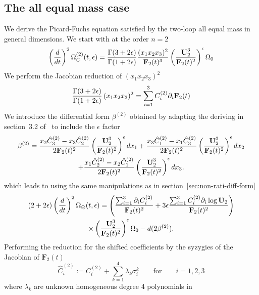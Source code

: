 \documentclass[a4paper,12pt]{article}
\numberwithin{equation}{section}
\numberwithin{figure}{section}
\def\su{\circleddash}
\begin{document}
\subsection{The all equal mass case}\label{sec:2sunset1mass}
We derive the Picard-Fuchs equation satisfied by the two-loop all
equal mass in general dimensions. 
We  start with at the order $n=2$ 
\begin{equation}
 \left(d\over dt\right)^2
 \Omega_\su^{(2)}(t,\epsilon)={\Gamma(3+2\epsilon)\over\Gamma(1+2\epsilon)} {(x_1x_2x_3)^2\over \textbf{F}_2(t)^3}
 \left(\textbf{U}_2^3\over \textbf{F}_2(t)^2\right)^\epsilon  \Omega_0
\end{equation}
%
We perform the Jacobian reduction of $(x_1x_2x_3)^2$
\begin{equation}\label{e:reduc}
  {\Gamma(3+2\epsilon)\over\Gamma(1+2\epsilon)}\,  (x_1x_2x_3)^2= \sum_{i=1}^3 C_i^{(2)}\partial_i \textbf{F}_2(t)
\end{equation}
%
We introduce the differential form $\beta^{(2)}$ obtained by adapting the deriving in section~3.2
 of~\cite{Bloch:2016izu} to include the $\epsilon$ factor
 \begin{multline}
   \beta^{(2)}=   {x_2 \hat C_3^{(2)}-x_3 \hat C_2^{(2)}\over
   2  \textbf{F}_2(t)^2} \left(\textbf{U}_2^3\over \textbf{F}_2(t)^2\right)^\epsilon dx_1+   {x_3 \hat C_1^{(2)}-x_1 \hat C_3^{(2)}\over
    2 \textbf{F}_2(t)^2} \left(\textbf{U}_2^3\over \textbf{F}_2(t)^2\right)^\epsilon dx_2\cr
   +  {x_1 \hat C_2^{(2)}-x_2 \hat C_1^{(2)}\over
    2 \textbf{F}_2(t)^2} \left(\textbf{U}_2^3\over \textbf{F}_2(t)^2\right)^\epsilon dx_3.
 \end{multline}
which leads to using the same manipulations as in section~\ref{sec:non-rati-diff-form}
\begin{multline}
 (2+2\epsilon)\left(d\over dt\right)^2
 \Omega_\su(t,\epsilon)=
 \left({\sum_{i=1}^3 \partial_i C_i^{(2)}\over
     \textbf{F}_2(t)^{2}}+3\epsilon{\sum_{i=1}^3 C_i^{(2)}\partial_i
     \log \textbf{U}_2\over \textbf{F}_2(t)^{2}}\right)\cr \times\left(\textbf{U}_2^3\over \textbf{F}_2(t)^2\right)^\epsilon \Omega_0-d(2\beta^{(2)}).
\end{multline}
%
Performing the reduction for the shifted coefficients by the syzygies
of the Jacobian of $\textbf{F}_2(t)$
\begin{equation}
    \hat C_i^{(2)}:=C_i^{(2)}+\sum_{k=1}^4 \lambda_k
      \sigma^k_i \qquad \textrm{for}\qquad i=1,2,3
    \end{equation}
    where $\lambda_k$ are unknown homogeneous degree 4 polynomials in
\end{document}
